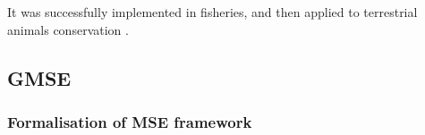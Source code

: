 \documentclass[12pt,a4paper]{article}
\begin{document}
It was successfully implemented in fisheries, and then applied to terrestrial animals conservation \citep{BUNNEFELD2011441, bunnefeld2013incentivizing}.


\subsection{GMSE}%

\subsubsection{Formalisation of MSE framework}
\end{document}
